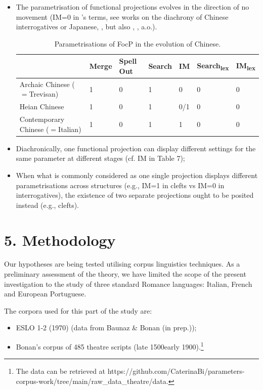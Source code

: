 \documentclass[fleqn,10pt]{wlscirep}
\begin{document}
\begin{itemize}
\item The parametrisation of functional projections evolves in the direction of no movement (IM=0 in \citeauthor{rizzi2017}’s \citeyear{rizzi2017} terms, see works on the diachrony of Chinese interrogatives \citealt{aldridge2010clause} or Japanese, \citealt{aldridge2009old}, but also \citealt{roberts2003syntactic}, \citealt{dadan2019}, a.o.).

\begin{table}[ht]
    \centering
    \begin{tabular}{|l|l|l|l|l|l|l|}
    \hline
     & Merge & Spell Out & Search & IM & Search\textsubscript{lex} & IM\textsubscript{lex} \\
    \hline
    Archaic Chinese ($=$Trevisan) & 1 & 0 & 1 & 0 & 0 & 0\\
    \hline
    Heian Chinese & 1 & 0 & 1 & 0/1 & 0 & 0 \\
    \hline
    Contemporary Chinese ($=$Italian) & 1 & 0 & 1 & 1 & 0 & 0 \\
    \hline
    \end{tabular}
    \caption{\label{tab:samp2}Parametrisations of FocP in the evolution of Chinese.}
    \end{table}

\item Diachronically, one functional projection can display different settings for the same parameter at different stages (cf. IM in Table 7);

\item When what is commonly considered as one single projection displays different parametrisations across structures (e.g., IM=1 in clefts vs IM=0 in interrogatives), the existence of two separate projections ought to be posited instead (e.g., clefts).
\end{itemize}

\section*{5. Methodology}

Our hypotheses are being tested utilising corpus linguistics techniques. 
As a preliminary assessment of the theory, we have limited the scope of the present investigation to the study of three standard Romance languages: Italian, French and European Portuguese. 

\noindent The corpora used for this part of the study are: 

\begin{itemize}
\item[\ding{227}] \vspace*{-2mm} ESLO 1-2 (1970) (data from Baunaz \& Bonan (in prep.));
\item[\ding{227}] \vspace*{-2mm} Bonan's corpus of 485 theatre scripts (late 1500\-early 1900).\footnote{The data can be retrieved at https://github.com/CaterinaBi/parameters-corpus-work/tree/main/raw_data_theatre/data.}
\end{itemize}
\end{document}
